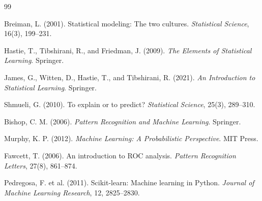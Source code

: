 \documentclass[UTF8,fontset=fandol,openany,zihao=-4]{ctexbook}
\begin{document}
\begin{thebibliography}{99}
\raggedright
{}
Breiman, L. (2001).
Statistical modeling: The two cultures.
\emph{Statistical Science}, 16(3), 199--231.

Hastie, T., Tibshirani, R., and Friedman, J. (2009).
\emph{The Elements of Statistical Learning}.
Springer.

James, G., Witten, D., Hastie, T., and Tibshirani, R. (2021).
\emph{An Introduction to Statistical Learning}.
Springer.

Shmueli, G. (2010).
To explain or to predict?
\emph{Statistical Science}, 25(3), 289--310.

Bishop, C. M. (2006).
\emph{Pattern Recognition and Machine Learning}.
Springer.

Murphy, K. P. (2012).
\emph{Machine Learning: A Probabilistic Perspective}.
MIT Press.

Fawcett, T. (2006).
An introduction to ROC analysis.
\emph{Pattern Recognition Letters}, 27(8), 861--874.

Pedregosa, F. et al. (2011).
Scikit-learn: Machine learning in Python.
\emph{Journal of Machine Learning Research}, 12, 2825--2830.
\end{thebibliography}
\end{document}
